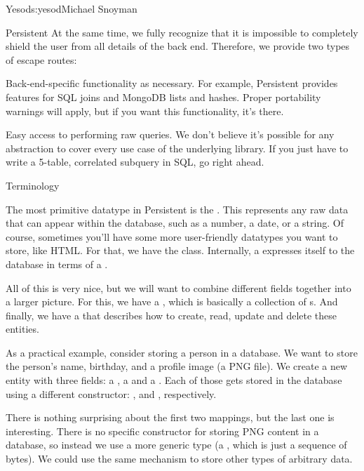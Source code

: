 \begin{aosachapter}{Yesod}{s:yesod}{Michael Snoyman}
\begin{aosasect1}{Persistent}
At the same time, we fully recognize that it is impossible to
completely shield the user from all details of the
back end. Therefore, we provide two types of escape routes:

\begin{aosaitemize}

\item Back-end-specific functionality as necessary. For
  example, Persistent provides features for SQL joins and MongoDB
  lists and hashes. Proper portability warnings will apply, but if you
  want this functionality, it's there.

\item Easy access to performing raw queries. We don't believe it's
  possible for any abstraction to cover every use case of the
  underlying library. If you just have to write a 5-table, correlated
  subquery in SQL, go right ahead.

\end{aosaitemize}

\begin{aosasect2}{Terminology}

The most primitive datatype in Persistent is the
. This represents any raw data that can appear
within the database, such as a number, a date, or a string. Of course,
sometimes you'll have some more user-friendly datatypes you want to
store, like HTML. For that, we have the 
class. Internally, a  expresses itself to the
database in terms of a .

All of this is very nice, but we will want to combine different fields
together into a larger picture. For this, we have a
, which is basically a collection of
s. And finally, we have a 
that describes how to create, read, update and delete these entities.

As a practical example, consider storing a person in a database. We
want to store the person's name, birthday, and a profile image (a PNG
file). We create a new entity  with three fields: a
, a  and a . Each of those gets stored
in the database using a different  constructor:
,  and ,
respectively.

There is nothing surprising about the first two mappings, but the last
one is interesting. There is no specific constructor for storing PNG
content in a database, so instead we use a more generic type (a
, which is just a sequence of bytes). We could use the same
mechanism to store other types of arbitrary data.


\end{aosasect2}
\end{aosasect1}
\end{aosachapter}
